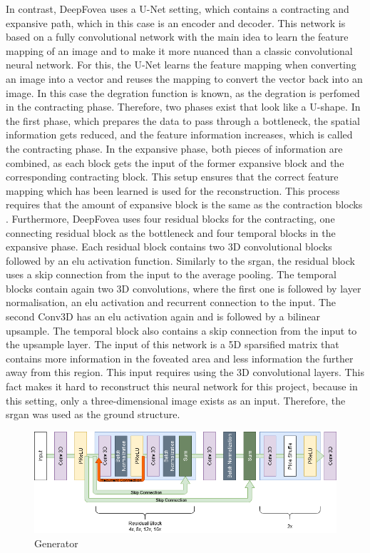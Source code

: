 \par
In contrast, DeepFovea uses a U-Net setting, which contains a contracting and expansive path, which in this case is an encoder and decoder. This network is based on a fully convolutional network with the main idea to learn the feature mapping of an image and to make it more nuanced than a classic convolutional neural network. For this, the U-Net learns the feature mapping when converting an image into a vector and reuses the mapping to convert the vector back into an image. In this case the degration function is known, as the degration is perfomed in the contracting phase. Therefore, two phases exist that look like a U-shape. In the first phase, which prepares the data to pass through a bottleneck, the spatial information gets reduced, and the feature information increases, which is called the contracting phase. In the expansive phase, both pieces of information are combined, as each block gets the input of the former expansive block and the corresponding contracting block. This setup ensures that the correct feature mapping which has been learned is used for the reconstruction. This process requires that the amount of expansive block is the same as the contraction blocks \parencite{ronneberger2015}. Furthermore, DeepFovea uses four residual blocks for the contracting, one connecting residual block as the bottleneck and four temporal blocks in the expansive phase. Each residual block contains two 3D convolutional blocks followed by an \gls{elu} activation function. Similarly to the \gls{srgan}, the residual block uses a skip connection from the input to the average pooling. The temporal blocks contain again two 3D convolutions, where the first one is followed by layer normalisation, an \gls{elu} activation and recurrent connection to the input. The second Conv3D has an \gls{elu} activation again and is followed by a bilinear upsample. The temporal block also contains a skip connection from the input to the upsample layer. The input of this network is a 5D sparsified matrix that contains more information in the foveated area and less information the further away from this region. This input requires using the 3D convolutional layers. This fact makes it hard to reconstruct this neural network for this project, because in this setting, only a three-dimensional image exists as an input. Therefore, the \gls{srgan} was used as the ground structure.

\begin{figure}
    \includegraphics[width=\textwidth,height=\textheight,keepaspectratio]{logos/Generator.png}
     \caption{Generator}
    \label{fig:generator}
\end{figure}

